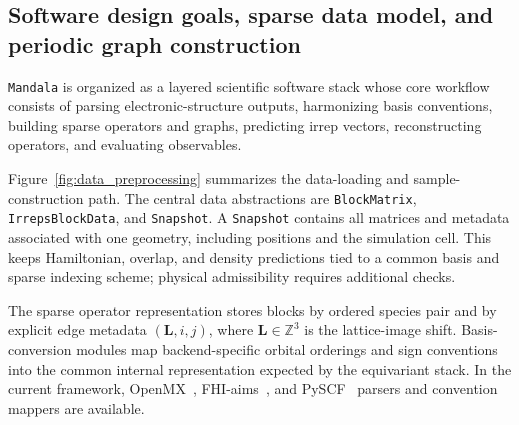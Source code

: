 \documentclass[preprint,12pt,compress,numafflabel]{elsarticle}
\begin{document}
\subsection{Software design goals, sparse data model, and periodic graph construction}
\label{subsec:workflow}

\texttt{Mandala} is organized as a layered scientific software stack whose core workflow consists of parsing electronic-structure outputs, harmonizing basis conventions, building sparse operators and graphs, predicting irrep vectors, reconstructing operators, and evaluating observables.

Figure~\ref{fig:data_preprocessing} summarizes the data-loading and sample-construction path.
The central data abstractions are \texttt{BlockMatrix}, \texttt{IrrepsBlockData}, and \texttt{Snapshot}.
A \texttt{Snapshot} contains all matrices and metadata associated with one geometry, including positions and the simulation cell.
This keeps Hamiltonian, overlap, and density predictions tied to a common basis and sparse indexing scheme; physical admissibility requires additional checks.

The sparse operator representation stores blocks by ordered species pair and by explicit edge metadata $(\bm{L},i,j)$, where $\bm{L}\in\mathbb{Z}^3$ is the lattice-image shift.
Basis-conversion modules map backend-specific orbital orderings and sign conventions into the common internal representation expected by the equivariant stack.
In the current framework, OpenMX~\cite{ozaki2003,ozakikino2004}, FHI-aims~\cite{blum2009}, and PySCF~\cite{pyscf2020} parsers and convention mappers are available.
\end{document}

